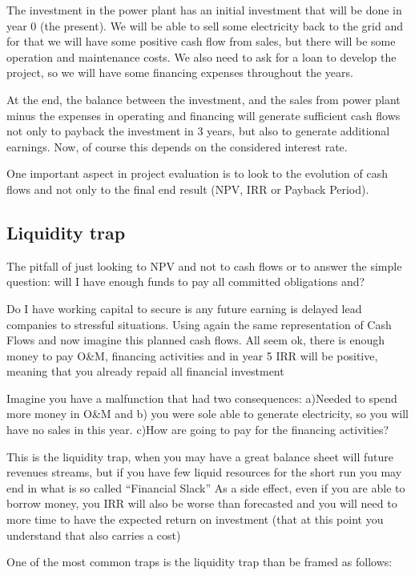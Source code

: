 \documentclass[]{book}
\theoremstyle{definition}
\theoremstyle{definition}
\theoremstyle{definition}
\theoremstyle{remark}
\begin{document}
The investment in the power plant has an initial investment that will be
done in year 0 (the present). We will be able to sell some electricity
back to the grid and for that we will have some positive cash flow from
sales, but there will be some operation and maintenance costs. We also
need to ask for a loan to develop the project, so we will have some
financing expenses throughout the years.

At the end, the balance between the investment, and the sales from power
plant minus the expenses in operating and financing will generate
sufficient cash flows not only to payback the investment in 3 years, but
also to generate additional earnings. Now, of course this depends on the
considered interest rate.

One important aspect in project evaluation is to look to the evolution
of cash flows and not only to the final end result (NPV, IRR or Payback
Period).

\subsection{Liquidity trap}\label{liquidity-trap}

The pitfall of just looking to NPV and not to cash flows or to answer
the simple question: will I have enough funds to pay all committed
obligations and?

Do I have working capital to secure is any future earning is delayed
lead companies to stressful situations. Using again the same
representation of Cash Flows and now imagine this planned cash flows.
All seem ok, there is enough money to pay O\&M, financing activities and
in year 5 IRR will be positive, meaning that you already repaid all
financial investment

Imagine you have a malfunction that had two consequences: a)Needed to
spend more money in O\&M and b) you were sole able to generate
electricity, so you will have no sales in this year. c)How are going to
pay for the financing activities?

This is the liquidity trap, when you may have a great balance sheet will
future revenues streams, but if you have few liquid resources for the
short run you may end in what is so called ``Financial Slack'' As a side
effect, even if you are able to borrow money, you IRR will also be worse
than forecasted and you will need to more time to have the expected
return on investment (that at this point you understand that also
carries a cost)

One of the most common traps is the liquidity trap than be framed as
follows:
\end{document}
